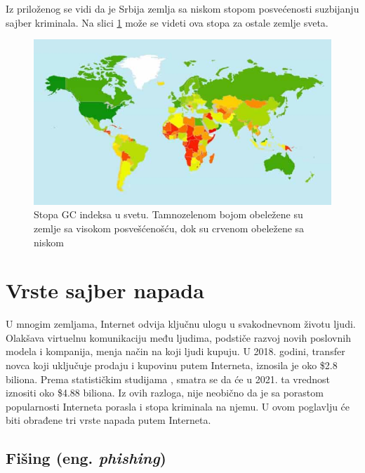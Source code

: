 \documentclass[a4paper]{article}
\theoremstyle{break}
\begin{document}
{Iz priloženog se vidi da je Srbija zemlja sa niskom stopom posvećenosti suzbijanju sajber kriminala. Na slici \ref{fig:svet} može se videti ova stopa za ostale zemlje sveta.

\begin{figure}[h!]
\begin{center}
\includegraphics[scale = 0.3]{itu_worldmap.jpg}
\end{center}
\caption{Stopa GC indeksa u svetu. Tamnozelenom bojom obeležene su zemlje sa visokom posvešćenošću, dok su crvenom obeležene sa niskom}
\label{fig:svet}
\end{figure}

\newpage

 
\section{Vrste sajber napada}

\label{sec:vrste_sajber_napada}

U mnogim zemljama, Internet odvija ključnu ulogu u svakodnevnom životu ljudi. Olakšava virtuelnu komunikaciju među ljudima, podstiče razvoj novih poslovnih modela i kompanija, menja način na koji ljudi kupuju. U 2018. godini, transfer novca koji uključuje prodaju i kupovinu putem Interneta, iznosila je oko \$2.8 biliona. Prema statističkim studijama \cite{statistika}, smatra se da će u 2021. ta vrednost iznositi oko \$4.88 biliona. Iz ovih razloga, nije neobično da je sa porastom popularnosti Interneta porasla i stopa kriminala na njemu. U ovom poglavlju će biti obrađene tri vrste napada putem Interneta.



\subsection{Fišing (eng. {\em phishing})}
\label{subsec:phishing}

}
\end{document}
